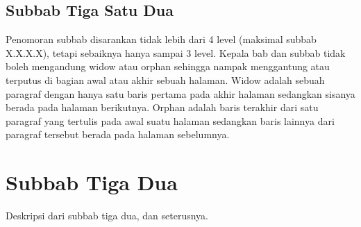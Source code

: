 \subsection{Subbab Tiga Satu Dua}

Penomoran subbab disarankan tidak lebih dari 4 level (maksimal subbab X.X.X.X), tetapi sebaiknya hanya sampai 3 level. Kepala bab dan subbab tidak boleh mengandung widow atau orphan sehingga nampak menggantung atau terputus di bagian awal atau akhir sebuah halaman. Widow adalah sebuah paragraf dengan hanya satu baris pertama pada akhir halaman sedangkan sisanya berada pada halaman berikutnya. Orphan adalah baris terakhir dari satu paragraf yang tertulis pada awal suatu halaman sedangkan baris lainnya dari paragraf tersebut berada pada halaman sebelumnya.

\section{Subbab Tiga Dua}

Deskripsi dari subbab tiga dua, dan seterusnya.

